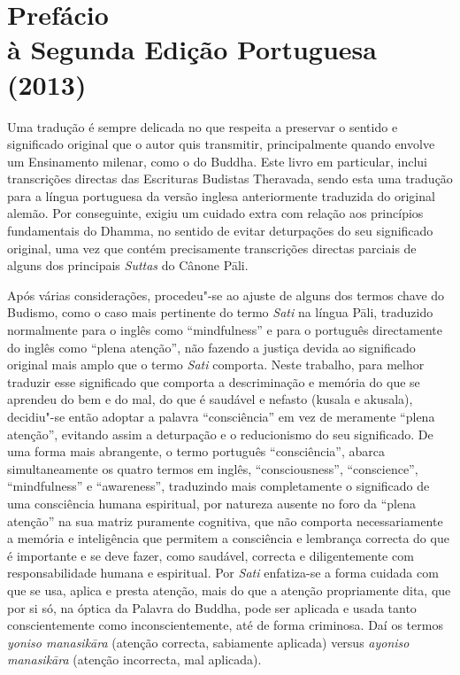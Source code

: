 \chapter[Prefácio à Segunda Edição Portuguesa (2013)]{Prefácio\\ à Segunda Edição Portuguesa\\ (2013)}

Uma tradução é sempre delicada no que respeita a preservar o sentido e
significado original que o autor quis transmitir, principalmente quando envolve
um Ensinamento milenar, como o do Buddha. Este livro em particular, inclui
transcrições directas das Escrituras Budistas Theravada, sendo esta uma tradução
para a língua portuguesa da versão inglesa anteriormente traduzida do original
alemão. Por conseguinte, exigiu um cuidado extra com relação aos princípios
fundamentais do Dhamma, no sentido de evitar deturpações do seu significado
original, uma vez que contém precisamente transcrições directas parciais de
alguns dos principais \emph{Suttas} do Cânone Pāli.

Após várias considerações, procedeu"-se ao ajuste de alguns dos termos chave do
Budismo, como o caso mais pertinente do termo \emph{Sati} na língua Pāli,
traduzido normalmente para o inglês como “mindfulness” e para o português
directamente do inglês como “plena atenção”, não fazendo a justiça devida ao
significado original mais amplo que o termo \emph{Sati} comporta. Neste trabalho,
para melhor traduzir esse significado que comporta a descriminação e memória do 
que se aprendeu do bem e do mal, do que é saudável e nefasto (kusala e akusala),
decidiu"-se então adoptar a palavra “consciência” em vez de meramente “plena
atenção”, evitando assim a deturpação e o reducionismo do seu significado. De
uma forma mais abrangente, o termo português “consciência”, abarca
simultaneamente os quatro termos em inglês, “consciousness”, “conscience”,
“mindfulness” e “awareness”, traduzindo mais completamente o significado
de uma consciência humana espiritual, por natureza ausente no foro da “plena atenção”
na sua matriz puramente cognitiva, que não comporta necessariamente a memória e
inteligência que permitem a consciência e lembrança correcta do que é importante
e se deve fazer, como saudável, correcta e diligentemente com responsabilidade humana
e espiritual. Por \emph{Sati} enfatiza-se a forma cuidada com que se
usa, aplica e presta atenção, mais do que a atenção propriamente dita, que por
si só, na óptica da Palavra do Buddha, pode ser aplicada e usada tanto 
conscientemente como inconscientemente, até de forma criminosa. 
Daí os termos \emph{yoniso manasikāra} (atenção correcta, sabiamente aplicada) 
versus \emph{ayoniso manasikāra} (atenção incorrecta, mal aplicada).

